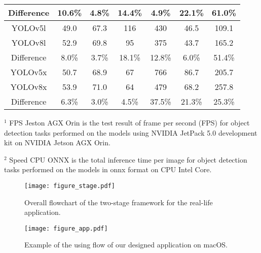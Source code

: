 \documentclass[default,iicol]{sn-jnl}
\theoremstyle{thmstyleone}\newtheorem{theorem}{Theorem}\newtheorem{proposition}[theorem]{Proposition}
\theoremstyle{thmstyletwo}\newtheorem{example}{Example}\newtheorem{remark}{Remark}\theoremstyle{thmstylethree}\newtheorem{definition}{Definition}
\begin{document}
\begin{table*}[]
{\begin{tabular}{ccccccc}
Difference & {\color{red}10.6\%} & {\color{red}4.8\%} & {\color{red}14.4\%} & {\color{blue}4.9\%} & {\color{blue}22.1\%} & {\color{blue}61.0\%} \\ \hline
YOLOv5l & 49.0 & 67.3 & 116 & 430 & 46.5 & 109.1 \\
YOLOv8l & 52.9 & 69.8 & 95 & 375 & 43.7 & 165.2 \\
Difference & {\color{red}8.0\%} & {\color{red}3.7\%} & {\color{red}18.1\%} & {\color{red}12.8\%} & {\color{red}6.0\%} & {\color{blue}51.4\%} \\ \hline
YOLOv5x & 50.7 & 68.9 & 67 & 766 & 86.7 & 205.7 \\
YOLOv8x & 53.9 & 71.0 & 64 & 479 & 68.2 & 257.8 \\
Difference & {\color{red}6.3\%} & {\color{red}3.0\%} & {\color{red}4.5\%} & {\color{red}37.5\%} & {\color{red}21.3\%} & {\color{blue}25.3\%} \\ \hline
\end{tabular}}
\begin{tablenotes}
\footnotesize
\item[$^1$]
FPS Jeston AGX Orin is the test result of frame per second (FPS) for object detection tasks performed on the models using NVIDIA JetPack 5.0 development kit on NVIDIA Jetson AGX Orin.
\item[$^2$]
Speed CPU ONNX is the total inference time per image for object detection tasks performed on the models in onnx format on CPU Intel Core.
\end{tablenotes}
\end{table*}

\begin{figure*}[h]
  \centering
  \texttt{[image: figure\_stage.pdf]}
  \caption{Overall flowchart of the two-stage framework for the real-life application.}
  \label{fig_stage}
\end{figure*}

\begin{figure*}[h]
  \centering
  \texttt{[image: figure\_app.pdf]}
  \caption{Example of the using flow of our designed application on macOS.}
  \label{fig_app}
\end{figure*}
\end{document}
